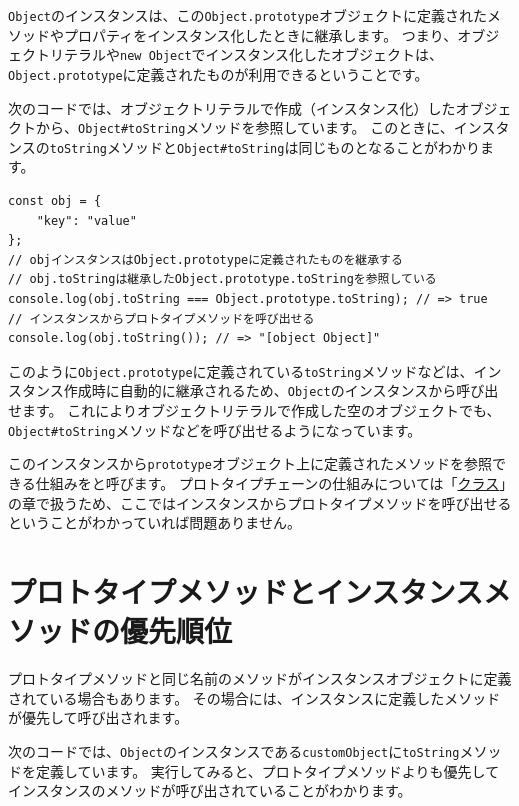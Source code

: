 \texttt{Object}のインスタンスは、この\texttt{Object.prototype}オブジェクトに定義されたメソッドやプロパティをインスタンス化したときに継承します。
つまり、オブジェクトリテラルや\texttt{new Object}でインスタンス化したオブジェクトは、\texttt{Object.prototype}に定義されたものが利用できるということです。

次のコードでは、オブジェクトリテラルで作成（インスタンス化）したオブジェクトから、\texttt{Object\#toString}メソッドを参照しています。
このときに、インスタンスの\texttt{toString}メソッドと\texttt{Object\#toString}は同じものとなることがわかります。

\begin{lstlisting}
const obj = {
    "key": "value"
};
// objインスタンスはObject.prototypeに定義されたものを継承する
// obj.toStringは継承したObject.prototype.toStringを参照している
console.log(obj.toString === Object.prototype.toString); // => true
// インスタンスからプロトタイプメソッドを呼び出せる
console.log(obj.toString()); // => "[object Object]"
\end{lstlisting}

このように\texttt{Object.prototype}に定義されている\texttt{toString}メソッドなどは、インスタンス作成時に自動的に継承されるため、\texttt{Object}のインスタンスから呼び出せます。
これによりオブジェクトリテラルで作成した空のオブジェクトでも、\texttt{Object\#toString}メソッドなどを呼び出せるようになっています。

このインスタンスから\texttt{prototype}オブジェクト上に定義されたメソッドを参照できる仕組みを\textbf{}と呼びます。
プロトタイプチェーンの仕組みについては「\hyperlink{class}{クラス}」の章で扱うため、ここではインスタンスからプロトタイプメソッドを呼び出せるということがわかっていれば問題ありません。

\hypertarget{same-method-name-order}{%
\section{プロトタイプメソッドとインスタンスメソッドの優先順位}\label{same-method-name-order}}

プロトタイプメソッドと同じ名前のメソッドがインスタンスオブジェクトに定義されている場合もあります。
その場合には、インスタンスに定義したメソッドが優先して呼び出されます。

次のコードでは、\texttt{Object}のインスタンスである\texttt{customObject}に\texttt{toString}メソッドを定義しています。
実行してみると、プロトタイプメソッドよりも優先してインスタンスのメソッドが呼び出されていることがわかります。

